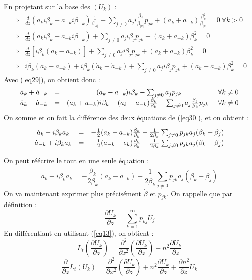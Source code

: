 \documentclass{article}
\begin{document}
En projetant sur la base des $(U_k)$ :
\begin{eqnarray*}
\Rightarrow& \frac{d}{dz} (a_ki\beta_k+a_{-k}i\beta_{-k})\frac{1}{\beta_{|k|}} + \sum_{j\neq 0} a_ji\frac{\beta_j}{\beta_{|k|}}p_{jk}+(a_k+a_{-k})\frac{\beta_k^2}{\beta_{|k|}}=0\ \forall k>0\\
\Rightarrow& \frac{d}{dz} (a_ki\beta_k+a_{-k}i\beta_{-k})+ \sum_{j\neq 0} a_ji\beta_jp_{jk}+(a_k+a_{-k})\beta_k^2=0\\
\Rightarrow& \frac{d}{dz} [i\beta_k(a_k-a_{-k})]+\sum_{j\neq 0} a_ji\beta_jp_{jk}+(a_k+a_{-k})\beta_k^2=0\\
\Rightarrow& i\dot{\beta}_k(a_k-a_{-k})+i\beta_k(\dot{a}_k-\dot{a}_{-k})+\sum_{j\neq 0} a_ji\beta_jp_{jk}+(a_k+a_{-k})\beta_k^2=0
\end{eqnarray*}
Avec (\ref{eq29}), on obtient donc :
\begin{equation} \label{eq30}
\begin{array}{c c c c}
	\dot{a}_k+\dot{a}_{-k}&=&(a_k-a_{-k})i\beta_k-\sum_{j\neq 0} a_j p_{jk} &\forall k\neq 0\\
	\dot{a}_k-\dot{a}_{-k}&=&(a_k+a_{-k})i\beta_k-(a_k-a_{-k})\frac{\dot{\beta}_k}{\beta_k}-\sum_{j\neq 0}a_j\frac{\beta_j}{\beta_k}p_{jk}\ &\forall k\neq 0\\
\end{array}
\end{equation}
On somme et on fait la différence des deux équations de (\ref{eq30}), et on obtient :
\begin{equation} \label{eq31}
\begin{array}{c c c}
\dot{a}_k-i\beta_ka_k&=&-\frac{1}{2}(a_k-a_{-k})\frac{\dot{\beta}_k}{\beta_k}-\frac{1}{2\beta_k}\sum_{j\neq 0}p_{jk}a_j(\beta_k+\beta_j)\\
\dot{a}_{-k}+i\beta_ka_k&=&-\frac{1}{2}(a_{-k}-a_k)\frac{\dot{\beta}_k}{\beta_k}-\frac{1}{2\beta_k}\sum_{j\neq 0}p_{jk}a_j(\beta_k-\beta_j)\\
\end{array}\end{equation}

On peut réécrire le tout en une seule équation : 
\begin{equation}\label{eq32}
\dot{a}_k-i\beta_ka_k=-\frac{\dot{\beta}_k}{2\beta_k}(a_k-a_{-k})-\frac{1}{2\beta_k}\sum_{j\neq 0}p_{jk}a_j(\beta_k+\beta_j)
\end{equation}
On va maintenant exprimer plus précisément $\dot{\beta}$ et $p_{jk}$. On rappelle que par définition :
\[\frac{\partial U_k}{\partial z}=\sum_{k=1}^\infty p_{kj}U_j\]
En différentiant en utilisant (\ref{eq13}), on obtient :
\[L_t\left( \frac{\partial U_k}{\partial z}\right)=\frac{\partial^2}{\partial x^2}\left(\frac{\partial U_k}{\partial z}\right) + n^2\frac{\partial U_k}{\partial z}\]
\[\frac{\partial }{\partial z}L_t\left( U_k\right)=\frac{\partial^2}{\partial x^2}\left(\frac{\partial U_k}{\partial z}\right) + n^2\frac{\partial U_k}{\partial z}+\frac{\partial n^2}{\partial z} U_k\]
\end{document}
